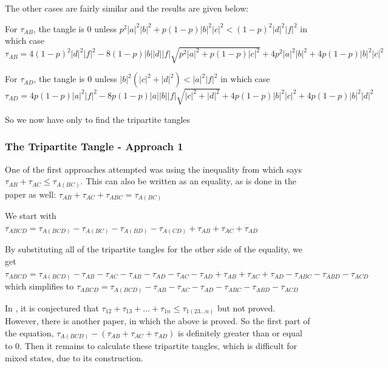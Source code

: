 \documentclass[12pt,a4paper]{article}
\numberwithin{equation}{section}
\begin{document}
\vskip 2mm

The other cases are fairly similar and the results are given below:

\vskip 2mm

For $\tau_{AB}$, the tangle is $0$ unless $p^2|a|^2|b|^2 + p(1-p)|b|^2|c|^2 < (1-p)^2|d|^2|f|^2$ in which case $\tau_{AB} = 4(1-p)^2|d|^2|f|^2 - 8(1-p)|b||d||f|\sqrt{p^2|a|^2 + p(1-p)|c|^2} +4p^2|a|^2|b|^2 + 4p(1-p)|b|^2|c|^2$

\vskip 2mm

For $\tau_{AD}$, the tangle is $0$ unless $|b|^2(|c|^2 + |d|^2) < |a|^2|f|^2$ in which case $\tau_{AD} = 4p(1-p)|a|^2|f|^2 - 8p(1-p)|a||b||f|\sqrt{|c|^2 + |d|^2} + 4p(1-p)|b|^2|c|^2 + 4p(1-p)|b|^2|d|^2$

\vskip 2mm

So we now have only to find the tripartite tangles

\newpage

\subsubsection{The Tripartite Tangle - Approach 1}
\label{subsubsec:fourTripartite1}

One of the first approaches attempted was using the inequality from \cite{CKW} which says $\tau_{AB} + \tau_{AC} \leq \tau_{A(BC)}$. This can also be written as an equality, as is done in the paper as well: $\tau_{AB} + \tau_{AC} + \tau_{ABC} = \tau_{A(BC)}$

We start with $\tau_{ABCD} = \tau_{A(BCD)} - \tau_{A(BC)} - \tau_{A(BD)} - \tau_{A(CD)} + \tau_{AB} + \tau_{AC} + \tau_{AD}$

\noindent By substituting all of the tripartite tangles for the other side of the equality, we get $\tau_{ABCD} = \tau_{A(BCD)} - \tau_{AB} - \tau_{AC} - \tau_{AB} - \tau_{AD} - \tau_{AC} - \tau_{AD} + \tau_{AB} + \tau_{AC} + \tau_{AD} - \tau_{ABC} - \tau_{ABD} - \tau_{ACD}$ which simplifies to $\tau_{ABCD} = \tau_{A(BCD)} - \tau_{AB} - \tau_{AC} - \tau_{AD} - \tau_{ABC} - \tau_{ABD} - \tau_{ACD}$

In \cite{CKW}, it is conjectured that $\tau_{12} + \tau_{13} + ... + \tau_{1n} \leq \tau_{1(23...n)}$ but not proved. However, there is another paper, \cite{OV} in which the above is proved. So the first part of the equation, $\tau_{A(BCD)} - (\tau_{AB} + \tau_{AC} + \tau_{AD})$ is definitely greater than or equal to $0$. Then it remains to calculate these tripartite tangles, which is difficult for mixed states, due to its construction.
\end{document}

